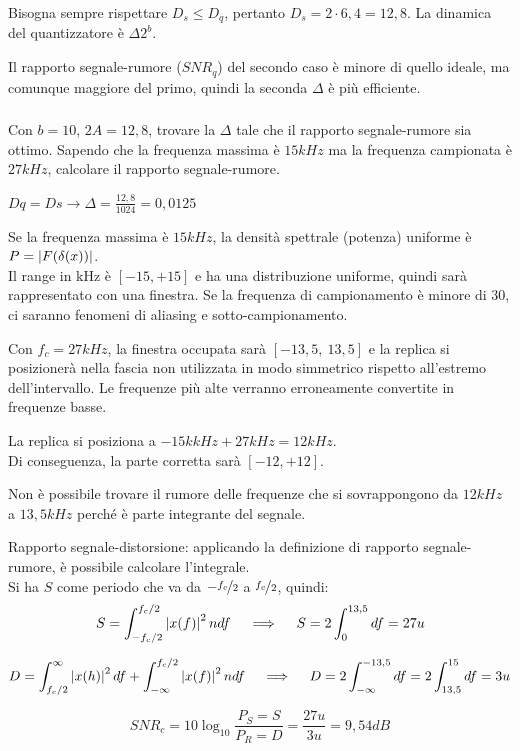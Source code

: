 Bisogna sempre rispettare $D_s \leq D_q$, pertanto $D_s = 2 \cdot 6,4 = 12,8$. La dinamica del quantizzatore è $\Delta 2^b$. 

Il rapporto segnale-rumore ($SNR_q$) del secondo caso è minore di quello ideale, ma comunque maggiore del primo, quindi la seconda $\Delta$ è più efficiente.

\subsubsection{}
Con $b = 10$, $2A = 12,8$, trovare la $\Delta$ tale che il rapporto segnale-rumore sia ottimo. Sapendo che la frequenza massima è $15 kHz$ ma la frequenza campionata è $27 kHz$, calcolare il rapporto segnale-rumore.

$Dq = Ds \rightarrow \Delta = \frac{12,8}{1024} = 0,0125$

Se la frequenza massima è $15 kHz$, la densità spettrale (potenza) uniforme è $P = \left|F(\delta(x))\right|$. \\
Il range in kHz è $[-15, +15]$ e ha una distribuzione uniforme, quindi sarà rappresentato con una finestra. 
Se la frequenza di campionamento è minore di 30, ci saranno fenomeni di aliasing e sotto-campionamento. 

Con $f_c = 27 kHz$, la finestra occupata sarà $[-13,5,\: 13,5]$ e la replica si posizionerà nella fascia non utilizzata in modo simmetrico rispetto all'estremo dell'intervallo. Le frequenze più alte verranno erroneamente convertite in frequenze basse.

La replica si posiziona a $-15 kkHz + 27kHz = 12 kHz$. \\
Di conseguenza, la parte corretta sarà $[-12, +12]$.

Non è possibile trovare il rumore delle frequenze che si sovrappongono da $12 kHz$ a $13,5 kHz$ perché è parte integrante del segnale.

Rapporto segnale-distorsione: applicando la definizione di rapporto segnale-rumore, è possibile calcolare l'integrale. \\
Si ha $S$ come periodo che va da $-\nicefrac{f_c}{2}$ a $\nicefrac{f_c}{2}$, quindi:
$$S = \int_{-f_c/2}^{f_c/2}\left|x(f)\right|^2ndf \quad \implies \quad S = 2\int_{0}^{13,5} df = 27u$$

$$D = \int_{f_c/2}^{\infty} \left|x(h)\right|^2 df +  \int_{-\infty}^{f_c/2}\left|x(f)\right|^2ndf \quad \implies \quad D = 2\int_{-\infty}^{-13,5} df = 2\int_{13,5}^{15} df = 3u$$

$$SNR_c = 10\log_{10} \frac{P_S = S}{P_R = D} = \frac{27u}{3u} = 9,54 dB$$

